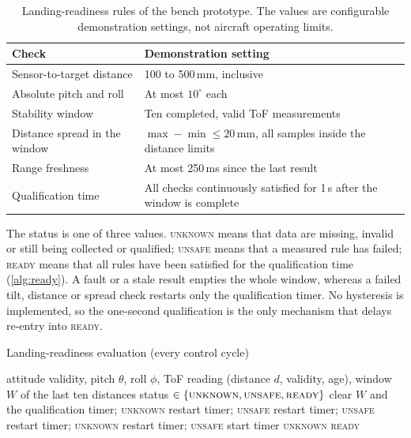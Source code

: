 \documentclass[11pt,a4paper]{article}
\begin{document}
\begin{table}[ht]
\centering
\small
\begin{tabular}{@{}L{4.6cm} L{10.1cm}@{}}
\toprule
\textbf{Check} & \textbf{Demonstration setting}\\
\midrule
Sensor-to-target distance & 100 to 500\,mm, inclusive\\
Absolute pitch and roll & At most $10^\circ$ each\\
Stability window & Ten completed, valid ToF measurements\\
Distance spread in the window & $\max-\min\le20$\,mm, all samples inside the distance limits\\
Range freshness & At most 250\,ms since the last result\\
Qualification time & All checks continuously satisfied for 1\,s after the window is complete\\
\bottomrule
\end{tabular}
\caption{Landing-readiness rules of the bench prototype. The values are configurable demonstration settings, not aircraft operating limits.}
\label{tab:rules}
\end{table}

\noindent
The status is one of three values. \textsc{unknown} means that data are missing, invalid or still being collected or qualified; \textsc{unsafe} means that a measured rule has failed; \textsc{ready} means that all rules have been satisfied for the qualification time (\cref{alg:ready}). A fault or a stale result empties the whole window, whereas a failed tilt, distance or spread check restarts only the qualification timer. No hysteresis is implemented, so the one-second qualification is the only mechanism that delays re-entry into \textsc{ready}.
 
\begin{algorithm}[ht]
\caption{Landing-readiness evaluation (every control cycle)}\label{alg:ready}
\begin{algorithmic}[1]
\Require attitude validity, pitch $\theta$, roll $\phi$, ToF reading (distance $d$, validity, age), window $W$ of the last ten distances
\Ensure status $\in\{\textsc{unknown},\textsc{unsafe},\textsc{ready}\}$
  \State clear $W$ and the qualification timer; \Return \textsc{unknown}
\EndIf
{} \State restart timer; \Return \textsc{unsafe} \EndIf
{} \State restart timer; \Return \textsc{unsafe} \EndIf
{} \State restart timer; \Return \textsc{unknown} \EndIf
{}
  \State restart timer; \Return \textsc{unsafe}
\EndIf
{} \State start timer \EndIf
{} \State \Return \textsc{unknown} 
\EndIf
\State \Return \textsc{ready}
\end{algorithmic}
\end{algorithm}
 
\end{document}
